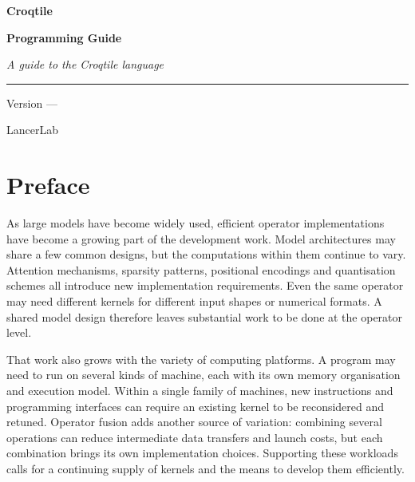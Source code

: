 \frontmatter
\begin{titlepage}
\centering
\vspace*{1.4cm}
{\sffamily\bfseries\fontsize{36}{40}\selectfont\color{croqink} Croqtile\par}
\vspace{0.1cm}
{\sffamily\bfseries\fontsize{26}{30}\selectfont\color{croqgreen} Programming Guide\par}
\vspace{0.8cm}
{\Large\itshape A guide to the Croqtile language\par}
\vspace{1.1cm}
\rule{0.72\linewidth}{0.6pt}\par
\vspace{0.9cm}
{\large Version \guideversion{} --- \guidereleasedate\par}
\vfill
{\small\color{croqgray} LancerLab\par}
\vspace{1.0cm}
\end{titlepage}
\thispagestyle{empty}
\cleardoublepage

\chapter*{Preface}

As large models have become widely used, efficient operator implementations
have become a growing part of the development work. Model architectures may
share a few common designs, but the computations within them continue to
vary. Attention mechanisms, sparsity patterns, positional encodings and
quantisation schemes all introduce new implementation requirements. Even
the same operator may need different kernels for different input shapes or
numerical formats. A shared model design therefore leaves substantial
work to be done at the operator level.

That work also grows with the variety of computing platforms. A program may
need to run on several kinds of machine, each with its own memory organisation
and execution model. Within a single family of machines, new instructions and
programming interfaces can require an existing kernel to be reconsidered
and retuned. Operator fusion adds another source of variation: combining
several operations can reduce intermediate data transfers and launch costs,
but each combination brings its own implementation choices. Supporting these
workloads calls for a continuing supply of kernels and the means to develop
them efficiently.

